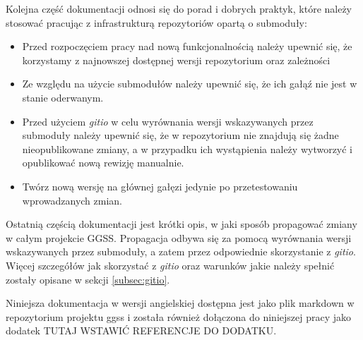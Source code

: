 Kolejna część dokumentacji odnosi się do porad i dobrych praktyk, które należy stosować pracując z infrastrukturą repozytoriów opartą o submoduły:
\begin{itemize}
    \item Przed rozpoczęciem pracy nad nową funkcjonalnością należy upewnić się, że korzystamy z najnowszej dostępnej wersji repozytorium oraz zależności
    \item Ze względu na użycie submodułów należy upewnić się, że ich gałąź nie jest w stanie oderwanym.
    \item Przed użyciem \emph{gitio} w celu wyrównania wersji wskazywanych przez submoduły należy upewnić się, że w repozytorium nie znajdują się żadne nieopublikowane zmiany, a w przypadku ich wystąpienia należy wytworzyć i opublikować nową rewizję manualnie.
    \item Twórz nową wersję na głównej gałęzi jedynie po przetestowaniu wprowadzanych zmian.
\end{itemize}

Ostatnią częścią dokumentacji jest krótki opis, w jaki sposób propagować zmiany w całym projekcie GGSS. Propagacja odbywa się za pomocą wyrównania wersji wskazywanych przez submoduły, a zatem przez odpowiednie skorzystanie z \emph{gitio}. Więcej szczegółów jak skorzystać z \emph{gitio} oraz warunków jakie należy spełnić zostały opisane w sekcji \ref{subsec:gitio}.

Niniejsza dokumentacja w wersji angielskiej dostępna jest jako plik markdown w repozytorium projektu ggss i została również dołączona do niniejszej pracy jako dodatek TUTAJ WSTAWIĆ REFERENCJE DO DODATKU.